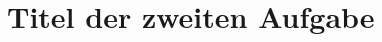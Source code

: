 \documentclass[german,notitlepage,smartquotes]{hgbreport}
\begin{document}
\section{Titel der zweiten Aufgabe}






\end{document}

